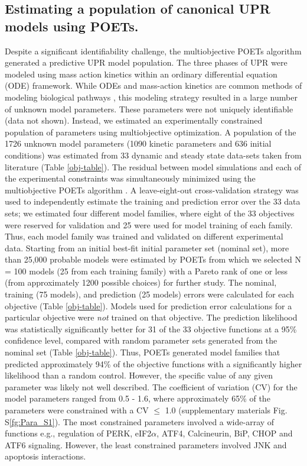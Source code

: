 \documentclass[fleqn,10pt]{wlscirep}
\begin{document}
\subsection*{Estimating a population of canonical UPR models using POETs.}
Despite a significant identifiability challenge, the multiobjective POETs algorithm generated a predictive UPR model population. The three phases of UPR were modeled using mass action kinetics within an ordinary differential equation (ODE) framework. While ODEs and mass-action kinetics are common methods of modeling biological pathways \cite{Schoeberl:2002rv, Chen:2009uq, Helmy:2009kx}, this modeling strategy resulted in a large number of unknown model parameters. These parameters were not uniquely identifiable (data not shown). Instead, we estimated an experimentally constrained population of parameters using multiobjective optimization. A population of the 1726 unknown model parameters (1090 kinetic parameters and 636 initial conditions) was estimated from 33 dynamic and steady state data-sets taken from literature (Table \ref{obj-table}). The residual between model simulations and each of the experimental constraints was simultaneously minimized using the multiobjective POETs algorithm \cite{Song:2010ij}. A leave-eight-out cross-validation strategy was used to independently estimate the training and prediction error over the 33 data sets; we estimated four different model families, where eight of the 33 objectives were reserved for validation and 25 were used for model training of each family. Thus, each model family was trained and validated on different experimental data. Starting from an initial best-fit initial parameter set (nominal set), more than 25,000 probable models were estimated by POETs from which we selected N = 100 models (25 from each training family) with a Pareto rank of one or less (from approximately 1200 possible choices) for further study. The nominal, training (75 models), and prediction (25 models) errors were calculated for each objective (Table \ref{obj-table}). Models used for prediction error calculations for a particular objective were \emph{not} trained on that objective. The prediction likelihood was statistically significantly better for 31 of the 33 objective functions at a 95\% confidence level, compared with random parameter sets generated from the nominal set (Table \ref{obj-table}). Thus, POETs generated model families that predicted approximately 94\% of the objective functions with a significantly higher likelihood than a random control. However, the specific value of any given parameter was likely not well described. The coefficient of variation (CV) for the model parameters ranged from 0.5 - 1.6, where approximately 65\% of the parameters were constrained with a CV $\leq$ 1.0 (supplementary materials Fig. S\ref{fg:Para_S1}). The most constrained parameters involved a wide-array of functions e.g., regulation of PERK, eIF2$\alpha$, ATF4, Calcineurin, BiP, CHOP and ATF6 signaling. However, the least constrained parameters involved JNK and apoptosis interactions.
\end{document}
